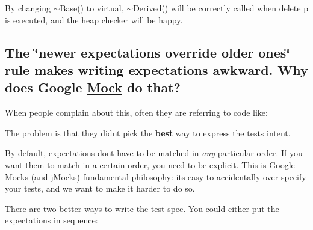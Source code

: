 By changing {\ttfamily $\sim$\+Base()} to virtual, {\ttfamily $\sim$\+Derived()} will be correctly called when {\ttfamily delete p} is executed, and the heap checker will be happy.

\subsection*{The \char`\"{}newer expectations override older ones\char`\"{} rule makes writing expectations awkward. Why does Google \mbox{\hyperlink{class_mock}{Mock}} do that?}

When people complain about this, often they are referring to code like\+:


\begin{DoxyCode}{0}
\end{DoxyCode}


The problem is that they didn\textquotesingle{}t pick the {\bfseries{best}} way to express the test\textquotesingle{}s intent.

By default, expectations don\textquotesingle{}t have to be matched in {\itshape any} particular order. If you want them to match in a certain order, you need to be explicit. This is Google \mbox{\hyperlink{class_mock}{Mock}}\textquotesingle{}s (and j\+Mock\textquotesingle{}s) fundamental philosophy\+: it\textquotesingle{}s easy to accidentally over-\/specify your tests, and we want to make it harder to do so.

There are two better ways to write the test spec. You could either put the expectations in sequence\+:


\begin{DoxyCode}{0}
\DoxyCodeLine{\{}
\DoxyCodeLine{\}}
\end{DoxyCode}


